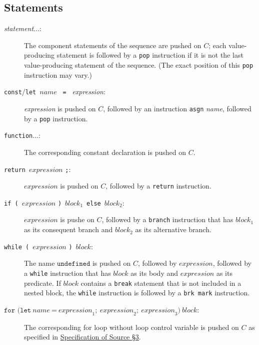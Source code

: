 \subsection*{Statements}

\begin{description}

\item[\textit{statement}$\ldots$:] The component statements of the sequence
are pushed on $C$; each
value-producing statement is followed by a \texttt{pop} instruction if it is not
the last value-producing statement of the sequence. (The exact position of this
\texttt{pop} instruction may vary.)

\item[\texttt{const}/\texttt{let}\ $\textit{name}$ \ \texttt{=} \ \textit{expression}:]
\textit{expression} is pushed on $C$, followed by an instruction \texttt{asgn} \textit{name},
followed by a \texttt{pop} instruction.

\item[\texttt{function}...:]
The corresponding constant declaration is pushed on $C$.

\item[\texttt{return}\ $\textit{expression}$ \texttt{;}:]
$\textit{expression}$ is pushed on $C$, followed by a \texttt{return} instruction.

\item[\texttt{if (}\ $\textit{expression}$ \texttt{)}\ $\textit{block}_1$\
\texttt{else}\ $\textit{block}_2$:]
$\textit{expression}$ is pushe on $C$, followed by a \texttt{branch} instruction
that has
$\textit{block}_1$ as its consequent branch and 
$\textit{block}_2$ as its alternative branch.

\item[\texttt{while (}\ $\textit{expression}$ \texttt{)}\ $\textit{block}$:]
The name $\texttt{undefined}$ is pushed on $C$, followed by
$\textit{expression}$, 
followed by a \texttt{while} instruction
that has
$\textit{block}$ as its body and $\textit{expression}$ as its predicate.
If $\textit{block}$ contains a \texttt{break}
statement that is not included in a nested block, the \texttt{while} instruction
is followed by a \texttt{brk mark} instruction.

\item[$\texttt{for (}\texttt{let}\ \textit{name} \ \texttt{=} \ \textit{expression}_1;\ \textit{expression}_2;\ \textit{expression}_3\texttt{)}\ \textit{block}$:]
The corresponding for loop without
loop control variable is pushed on $C$ as specified in
\href{https://docs.sourceacademy.org/source_3.pdf}{\color{blue}Specification of Source \S 3}.


\end{description}

